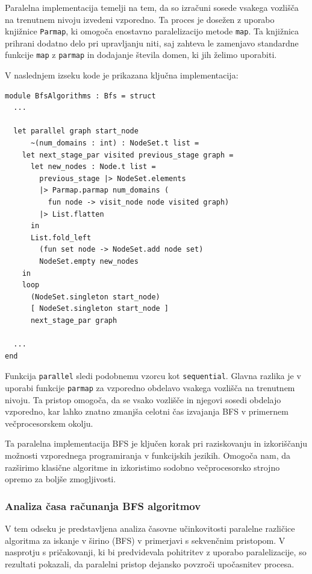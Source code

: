 \documentclass[mat1, tisk]{fmfdelo}
\begin{document}
Paralelna implementacija temelji na tem, da so izračuni sosede vsakega vozlišča na trenutnem nivoju izvedeni vzporedno.
Ta proces je dosežen z uporabo knjižnice \texttt{Parmap}, ki omogoča enostavno paralelizacijo metode \texttt{map}.
Ta knjižnica prihrani dodatno delo pri upravljanju niti, saj zahteva le zamenjavo standardne funkcije \texttt{map} z
\texttt{parmap} in dodajanje števila domen, ki jih želimo uporabiti.

V naslednjem izseku kode je prikazana ključna implementacija:

\begin{lstlisting}[label=lst:bfs_parallel]
module BfsAlgorithms : Bfs = struct
  ...

  let parallel graph start_node
      ~(num_domains : int) : NodeSet.t list =
    let next_stage_par visited previous_stage graph =
      let new_nodes : Node.t list =
        previous_stage |> NodeSet.elements
        |> Parmap.parmap num_domains (
          fun node -> visit_node node visited graph)
        |> List.flatten
      in
      List.fold_left
        (fun set node -> NodeSet.add node set)
        NodeSet.empty new_nodes
    in
    loop
      (NodeSet.singleton start_node)
      [ NodeSet.singleton start_node ]
      next_stage_par graph

  ...
end

\end{lstlisting}

Funkcija \texttt{parallel} sledi podobnemu vzorcu kot \texttt{sequential}. Glavna razlika je v uporabi funkcije
\texttt{parmap} za vzporedno obdelavo vsakega vozlišča na trenutnem nivoju. Ta pristop omogoča, da se vsako vozlišče
in njegovi sosedi obdelajo vzporedno, kar lahko znatno zmanjša celotni čas izvajanja BFS v primernem večprocesorskem okolju.

Ta paralelna implementacija BFS je ključen korak pri raziskovanju in izkoriščanju možnosti vzporednega programiranja
v funkcijskih jezikih. Omogoča nam, da razširimo klasične algoritme in izkoristimo sodobno večprocesorsko strojno
opremo za boljše zmogljivosti.

\subsubsection{Analiza časa računanja BFS algoritmov}

V tem odseku je predstavljena analiza časovne učinkovitosti paralelne različice algoritma za iskanje v širino (BFS)
v primerjavi s sekvenčnim pristopom. V nasprotju s pričakovanji, ki bi predvidevala pohitritev z uporabo paralelizacije,
so rezultati pokazali, da paralelni pristop dejansko povzroči upočasnitev procesa.
\end{document}
